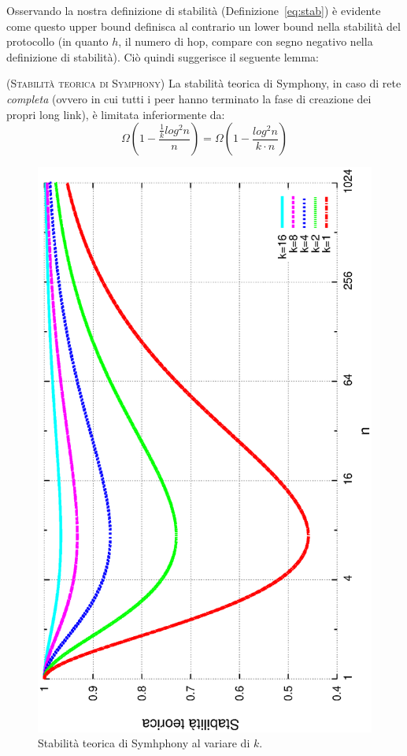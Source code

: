 \documentclass[prodmode,acmtap]{acmlarge}
\begin{document}
Osservando la nostra definizione di stabilità (Definizione~\ref{eq:stab}) è evidente come questo upper bound definisca al contrario un lower bound nella stabilità del protocollo (in quanto $h$, il numero di hop, compare con segno negativo nella definizione di stabilità). Ciò quindi suggerisce il seguente lemma:

\begin{lemma}{\textsc{(Stabilità teorica di Symphony)}} \label{lemma:stabilita}
La stabilità teorica di Symphony, in caso di rete \emph{completa} (ovvero in cui tutti i peer hanno terminato la fase di creazione dei propri long link), è limitata inferiormente da:
$$\Omega\left(1 - \frac{\frac{1}{k}log^2n}{n} \right) = \Omega\left(1 - \frac{log^2n}{k \cdot n}\right)$$
\end{lemma}

\begin{figure}
\centering
\includegraphics[scale=.5, angle=-90]{imgs/stab-teorica-2.eps}
\caption{Stabilità teorica di Symhphony al variare di $k$.}
\label{img:stab-teorica}
\end{figure}
\end{document}

